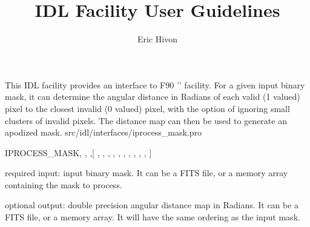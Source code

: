 
\sloppy

\title{\healpix IDL Facility User Guidelines}
 \section[iprocess\_mask]{ }
\label{idl:iprocess_mask}
\author{Eric Hivon}

\begin{facility}
{This IDL facility provides an interface to F90 '' facility. For a
given input binary mask, it can determine the angular distance in Radians of each valid (1 valued)
pixel to the closest invalid (0 valued) pixel, with the option of ignoring small
clusters of invalid pixels. The distance map can then be used to generate an
apodized mask.}
{src/idl/interfaces/iprocess\_mask.pro}
\end{facility}

\begin{IDLformat}
{IPROCESS\_MASK, 
,  
,[
,
,
,
,
,
, 
,
, 
,
,
]}
\end{IDLformat}

\begin{qualifiers}
  \begin{qulist}{} %
   \item[mask\_in]  required input: input binary
mask. It can be a FITS file, or a memory array containing the mask to process.
    \item[distance\_map]  optional
output: double precision angular distance map in Radians. It can be a FITS file, or a
   memory array. It will have the same ordering as the input mask.
  \end{qulist}
\end{qualifiers}

